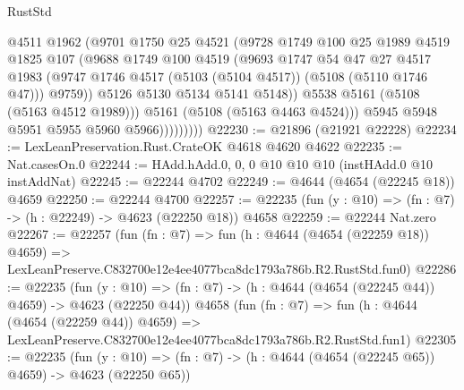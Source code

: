 \begin{lexlean}{RustStd}
\begin{coremodule}
                          @4511
                          @1962
                          (@9701
                            @1750
                            @25
                            @4521
                            (@9728
                              @1749
                              @100
                              @25
                              @1989
                              @4519
                              @1825
                              @107
                              (@9688
                                @1749
                                @100
                                @4519
                                (@9693
                                  @1747
                                  @54
                                  @47
                                  @27
                                  @4517
                                  @1983
                                  (@9747
                                    @1746
                                    @4517
                                    (@5103 (@5104 @4517))
                                    (@5108 (@5110 @1746 @47)))
                                  @9759))
                              @5126
                              @5130
                              @5134
                              @5141
                              @5148))
                          @5538
                          @5161
                          (@5108 (@5163 @4512 @1989)))
                        @5161
                        (@5108 (@5163 @4463 @4524)))
                      @5945
                      @5948
                      @5951
                      @5955
                      @5960
                      @5966)))))))))
@22230 := @21896 (@21921 @22228)
@22234 := LexLeanPreservation.Rust.CrateOK @4618 @4620 @4622
@22235 := Nat.casesOn.{0}
@22244 := HAdd.hAdd.{0, 0, 0} @10 @10 @10 (instHAdd.{0} @10 instAddNat)
@22245 := @22244 @4702
@22249 := @4644 (@4654 (@22245 @18)) @4659
@22250 := @22244 @4700
@22257 := @22235 (fun (y : @10) => (fn : @7) -> (h : @22249) -> @4623 (@22250 @18)) @4658
@22259 := @22244 Nat.zero
@22267 := @22257
    (fun (fn : @7) =>
    fun (h : @4644 (@4654 (@22259 @18)) @4659) =>
    LexLeanPreserve.C832700e12e4ee4077bca8dc1793a786b.R2.RustStd.fun0)
@22286 := @22235
    (fun (y : @10) => (fn : @7) -> (h : @4644 (@4654 (@22245 @44)) @4659) -> @4623 (@22250 @44))
    @4658
    (fun (fn : @7) =>
    fun (h : @4644 (@4654 (@22259 @44)) @4659) =>
    LexLeanPreserve.C832700e12e4ee4077bca8dc1793a786b.R2.RustStd.fun1)
@22305 := @22235
    (fun (y : @10) => (fn : @7) -> (h : @4644 (@4654 (@22245 @65)) @4659) -> @4623 (@22250 @65))

\end{coremodule}
\end{lexlean}
